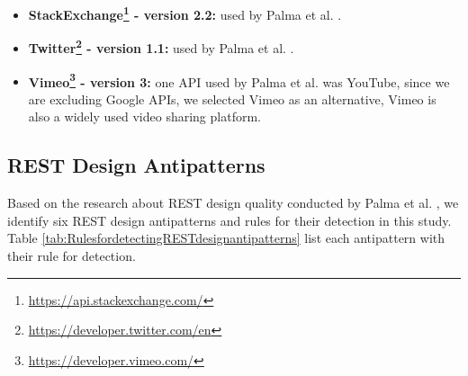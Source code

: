 \begin{itemize}
    \item \textbf{StackExchange\footnote{\url{https://api.stackexchange.com/}} - version 2.2:} used by Palma et al. \cite{linguistic}.
    \item \textbf{Twitter\footnote{\url{https://developer.twitter.com/en}} - version 1.1:} used by Palma et al. \cite{linguistic}.
    \item \textbf{Vimeo\footnote{\url{https://developer.vimeo.com/}} - version 3:} one API used by Palma et al. \cite{linguistic} was YouTube, since we are excluding Google APIs, we selected Vimeo as an alternative, Vimeo is also a widely used video sharing platform. 
\end{itemize}

\subsection{REST Design Antipatterns}

Based on the research about REST design quality conducted by Palma et al. \cite{design}, we identify six REST design antipatterns and rules for their detection in this study. Table \ref{tab:RulesfordetectingRESTdesignantipatterns} list each antipattern with their rule for detection.

